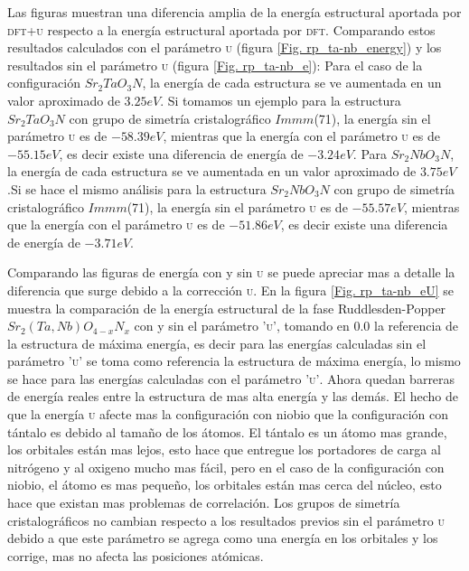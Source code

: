 Las figuras muestran una diferencia amplia de la energía estructural aportada por \textsc{dft+u} respecto a la energía estructural aportada por \textsc{dft}. Comparando estos resultados calculados con el parámetro \textsc{u} (figura \ref{Fig. rp_ta-nb_energy}) y los resultados sin el parámetro \textsc{u} (figura \ref{Fig. rp_ta-nb_e}): Para el caso de la configuración $Sr_{2}TaO_{3}N$, la energía de cada estructura se ve aumentada en un valor aproximado de $3.25 eV$. Si tomamos un ejemplo para la estructura $Sr_{2}TaO_{3}N$ con grupo de simetría cristalográfico $Immm$(71), la energía sin el parámetro \textsc{u} es de $-58.39eV$, mientras que la energía con el parámetro \textsc{u} es de $-55.15 eV$, es decir existe una diferencia de energía de $-3.24eV$. Para $Sr_{2}NbO_{3}N$, la energía de cada estructura se ve aumentada en un valor aproximado de $3.75 eV$ .Si se hace el mismo análisis para la estructura $Sr_{2}NbO_{3}N$ con grupo de simetría cristalográfico $Immm$(71), la energía sin el parámetro \textsc{u} es de $-55.57 eV$, mientras que la energía con el parámetro \textsc{u} es de $-51.86 eV$, es decir existe una diferencia de energía de $-3.71 eV$. 

Comparando las figuras de energía con y sin \textsc{u} se puede apreciar mas a detalle la diferencia que surge debido a la corrección \textsc{u}. En la figura \ref{Fig. rp_ta-nb_eU} se muestra la comparación de la energía estructural de la fase Ruddlesden-Popper $Sr_{2}(Ta,Nb)O_{4-x}N_{x}$ con y sin el parámetro \textsc{'u'}, tomando en $0.0$ la referencia de la estructura de máxima energía, es decir para las energías calculadas sin el parámetro \textsc{'u'} se toma como referencia la estructura de máxima energía, lo mismo se hace para las energías calculadas con el parámetro \textsc{'u'}.  Ahora quedan barreras de energía reales entre la estructura de mas alta energía y las demás. El hecho de que la energía \textsc{u} afecte mas la configuración con niobio que la configuración con tántalo es debido al tamaño de los átomos. El tántalo es un átomo mas grande, los orbitales están mas lejos, esto hace que entregue los portadores de carga al nitrógeno y al oxigeno mucho mas fácil, pero en el caso de la configuración con niobio, el átomo es mas pequeño, los orbitales están mas cerca del núcleo, esto hace que existan mas problemas de correlación\cite{acgarcia22july}. Los grupos de simetría cristalográficos no cambian respecto a los resultados previos sin el parámetro \textsc{u} debido a que este parámetro  se agrega como una energía en los orbitales y los corrige\cite{acgarcia15july}, mas no afecta las posiciones atómicas.

